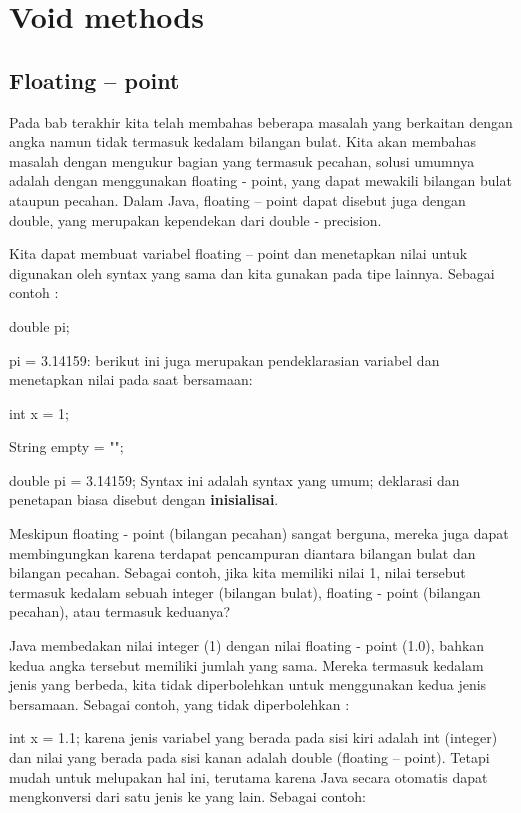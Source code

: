\chapter{Void methods}
\section{Floating – point}
Pada bab terakhir kita telah membahas beberapa masalah yang berkaitan dengan angka namun tidak termasuk kedalam bilangan bulat. Kita akan membahas masalah dengan mengukur bagian yang termasuk pecahan, solusi umumnya adalah dengan menggunakan floating - point, yang dapat mewakili bilangan bulat ataupun pecahan. Dalam Java, floating – point dapat disebut juga dengan double, yang merupakan kependekan dari double - precision.

Kita dapat membuat variabel floating – point dan menetapkan nilai untuk digunakan oleh syntax yang sama dan kita gunakan pada tipe lainnya. Sebagai contoh :\newline

	double pi;
	
	pi = 3.14159:\newline \newline	
berikut ini juga merupakan pendeklarasian variabel dan menetapkan nilai pada saat bersamaan:\newline

	int x = 1;
	
	String empty = "";
	
	double pi = 3.14159;\newline \newline
Syntax ini adalah syntax yang umum; deklarasi dan penetapan biasa disebut dengan \textbf {inisialisai}.

Meskipun floating - point (bilangan pecahan) sangat berguna, mereka juga dapat membingungkan karena terdapat pencampuran diantara bilangan bulat dan bilangan pecahan. Sebagai contoh, jika kita memiliki nilai 1, nilai tersebut termasuk kedalam sebuah integer (bilangan bulat), floating - point (bilangan pecahan), atau termasuk keduanya?

Java membedakan nilai integer (1) dengan nilai floating - point (1.0), bahkan kedua angka tersebut memiliki jumlah yang sama. Mereka termasuk kedalam jenis yang berbeda, kita tidak diperbolehkan untuk menggunakan kedua jenis bersamaan. Sebagai contoh, yang tidak diperbolehkan :\newline

	int x = 1.1;\newline \newline
karena jenis variabel yang berada pada sisi kiri adalah int (integer) dan nilai yang berada pada sisi kanan adalah double (floating – point). Tetapi mudah untuk melupakan hal ini, terutama karena Java secara otomatis dapat mengkonversi dari satu jenis ke yang lain. Sebagai contoh:\newline

